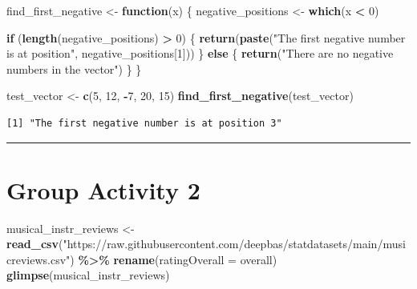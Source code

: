 \documentclass[
]{book}
\newenvironment{Shaded}{\begin{snugshade}}{\end{snugshade}}
\newcommand{\AttributeTok}[1]{\textcolor[rgb]{0.13,0.29,0.53}{#1}}
\newcommand{\ControlFlowTok}[1]{\textcolor[rgb]{0.13,0.29,0.53}{\textbf{#1}}}
\newcommand{\DecValTok}[1]{\textcolor[rgb]{0.00,0.00,0.81}{#1}}
\newcommand{\FunctionTok}[1]{\textcolor[rgb]{0.13,0.29,0.53}{\textbf{#1}}}
\newcommand{\NormalTok}[1]{#1}
\newcommand{\OtherTok}[1]{\textcolor[rgb]{0.56,0.35,0.01}{#1}}
\newcommand{\SpecialCharTok}[1]{\textcolor[rgb]{0.81,0.36,0.00}{\textbf{#1}}}
\newcommand{\StringTok}[1]{\textcolor[rgb]{0.31,0.60,0.02}{#1}}
\begin{document}
\begin{Shaded}
\begin{Highlighting}[]
\NormalTok{find\_first\_negative }\OtherTok{\textless{}{-}} \ControlFlowTok{function}\NormalTok{(x) \{}
\NormalTok{  negative\_positions }\OtherTok{\textless{}{-}} \FunctionTok{which}\NormalTok{(x }\SpecialCharTok{\textless{}} \DecValTok{0}\NormalTok{)}
  
  \ControlFlowTok{if}\NormalTok{ (}\FunctionTok{length}\NormalTok{(negative\_positions) }\SpecialCharTok{\textgreater{}} \DecValTok{0}\NormalTok{) \{}
    \FunctionTok{return}\NormalTok{(}\FunctionTok{paste}\NormalTok{(}\StringTok{"The first negative number is at position"}\NormalTok{, negative\_positions[}\DecValTok{1}\NormalTok{]))}
\NormalTok{  \} }\ControlFlowTok{else}\NormalTok{ \{}
    \FunctionTok{return}\NormalTok{(}\StringTok{"There are no negative numbers in the vector"}\NormalTok{)}
\NormalTok{  \}}
\NormalTok{\}}
\end{Highlighting}
\end{Shaded}

\begin{Shaded}
\begin{Highlighting}[]
\NormalTok{test\_vector }\OtherTok{\textless{}{-}} \FunctionTok{c}\NormalTok{(}\DecValTok{5}\NormalTok{, }\DecValTok{12}\NormalTok{, }\SpecialCharTok{{-}}\DecValTok{7}\NormalTok{, }\DecValTok{20}\NormalTok{, }\DecValTok{15}\NormalTok{)}
\FunctionTok{find\_first\_negative}\NormalTok{(test\_vector)}
\end{Highlighting}
\end{Shaded}

\begin{verbatim}
[1] "The first negative number is at position 3"
\end{verbatim}

\begin{center}\rule{0.5\linewidth}{0.5pt}\end{center}

\hypertarget{group-activity-2-1}{%
\section{Group Activity 2}\label{group-activity-2-1}}

\begin{Shaded}
\begin{Highlighting}[]
\NormalTok{musical\_instr\_reviews }\OtherTok{\textless{}{-}}  \FunctionTok{read\_csv}\NormalTok{(}\StringTok{"https://raw.githubusercontent.com/deepbas/statdatasets/main/musicreviews.csv"}\NormalTok{) }\SpecialCharTok{\%\textgreater{}\%} 
  \FunctionTok{rename}\NormalTok{(}\AttributeTok{ratingOverall =}\NormalTok{ overall)}
\FunctionTok{glimpse}\NormalTok{(musical\_instr\_reviews)}
\end{Highlighting}
\end{Shaded}
\end{document}
